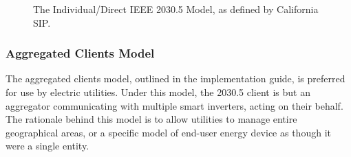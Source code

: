 \begin{figure}[H]
    \begin{center}
        \caption{The Individual/Direct IEEE 2030.5 Model, as defined by California SIP.}
    \end{center}
\end{figure}


\subsubsection{Aggregated Clients Model}
The aggregated clients model, outlined in the implementation guide, is preferred for use by electric utilities. Under this model, the 2030.5 client is but an aggregator communicating with multiple smart inverters, acting on their behalf.
The rationale behind this model is to allow utilities to manage entire geographical areas, or a specific model of end-user energy device as though it were a single entity.



